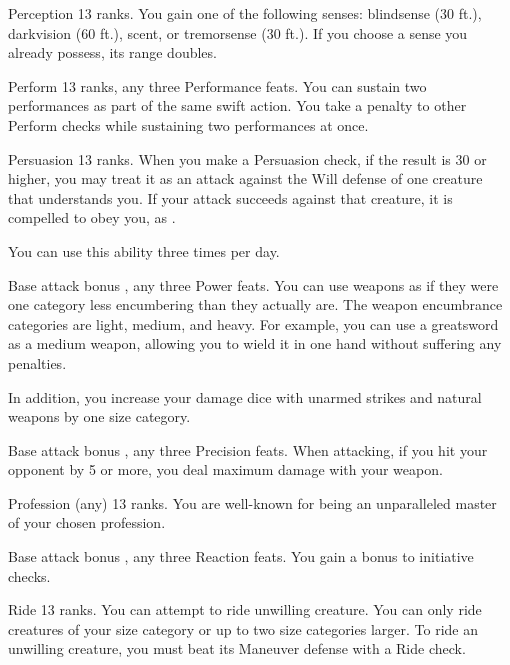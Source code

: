 \featpre Perception 13 ranks.
\featben You gain one of the following senses: blindsense (30 ft.), darkvision (60 ft.), scent, or tremorsense (30 ft.). If you choose a sense you already possess, its range doubles.

\featpres Perform 13 ranks, any three Performance feats.
\featben You can sustain two performances as part of the same swift action. You take a  penalty to other Perform checks while sustaining two performances at once.

\featpres Persuasion 13 ranks.
\featben When you make a Persuasion check, if the result is 30 or higher, you may treat it as an attack against the Will defense of one creature that understands you. If your attack succeeds against that creature, it is compelled to obey you, as .

You can use this ability three times per day.

\featpres Base attack bonus , any three Power feats.
\featben You can use weapons as if they were one category less encumbering than they actually are. The weapon encumbrance categories are light, medium, and heavy. For example, you can use a greatsword as a medium weapon, allowing you to wield it in one hand without suffering any penalties.

In addition, you increase your damage dice with unarmed strikes and natural weapons by one size category.

\featpre Base attack bonus , any three Precision feats.
\featben When attacking, if you hit your opponent by 5 or more, you deal maximum damage with your weapon.

\featpre Profession (any) 13 ranks.
\featben You are well-known for being an unparalleled master of your chosen profession.

\featpre Base attack bonus , any three Reaction feats.
\featben You gain a  bonus to initiative checks.

\featpre Ride 13 ranks.
\featben You can attempt to ride unwilling creature. You can only ride creatures of your size category or up to two size categories larger. To ride an unwilling creature, you must beat its Maneuver defense with a Ride check.

